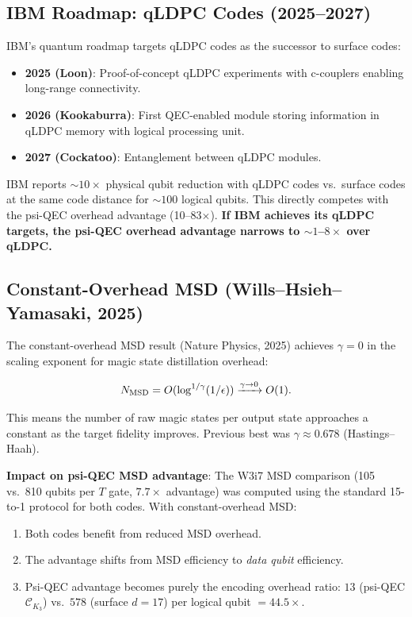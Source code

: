 \documentclass[11pt]{article}
\theoremstyle{definition}
\theoremstyle{remark}
\newcommand{\CK}{\mathcal{C}_K}
\begin{document}
\subsection{IBM Roadmap: qLDPC Codes (2025--2027)}
\label{sec:ibm-roadmap}

IBM's quantum roadmap targets qLDPC codes as the successor to surface codes:

\begin{itemize}[nosep]
  \item \textbf{2025 (Loon)}: Proof-of-concept qLDPC experiments with
    c-couplers enabling long-range connectivity.
  \item \textbf{2026 (Kookaburra)}: First QEC-enabled module storing
    information in qLDPC memory with logical processing unit.
  \item \textbf{2027 (Cockatoo)}: Entanglement between qLDPC modules.
\end{itemize}

IBM reports $\sim 10\times$ physical qubit reduction with qLDPC codes
vs.\ surface codes at the same code distance for $\sim 100$ logical qubits.
This directly competes with the psi-QEC overhead advantage (10--83$\times$).
\textbf{If IBM achieves its qLDPC targets, the psi-QEC overhead advantage
narrows to $\sim 1$--$8\times$ over qLDPC.}

\subsection{Constant-Overhead MSD (Wills--Hsieh--Yamasaki, 2025)}
\label{sec:constant-msd}

The constant-overhead MSD result (Nature Physics, 2025) achieves
$\gamma = 0$ in the scaling exponent for magic state distillation overhead:

\begin{equation}
  N_{\rm MSD} = O(\log^{1/\gamma}(1/\epsilon))
  \xrightarrow{\gamma \to 0} O(1).
  \label{eq:constant-msd}
\end{equation}

This means the number of raw magic states per output state approaches
a constant as the target fidelity improves.  Previous best was
$\gamma \approx 0.678$ (Hastings--Haah).

\textbf{Impact on psi-QEC MSD advantage}: The W3i7 MSD comparison
(105 vs.\ 810 qubits per $T$ gate, $7.7\times$ advantage) was computed
using the standard 15-to-1 protocol for both codes.  With constant-overhead
MSD:

\begin{enumerate}[nosep]
  \item Both codes benefit from reduced MSD overhead.
  \item The advantage shifts from MSD efficiency to \emph{data qubit}
    efficiency.
  \item Psi-QEC advantage becomes purely the encoding overhead ratio:
    $13$ (psi-QEC $\CK_3$) vs.\ $578$ (surface $d=17$) per logical
    qubit $= 44.5\times$.
\end{enumerate}
\end{document}
